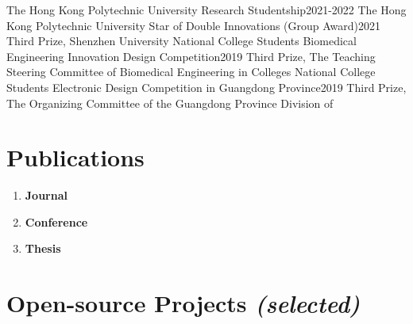 \documentclass[letterpaper,11pt]{article}
\begin{document}
    \resumeSubHeadingListStart
        \resumeSubheading
            {The Hong Kong Polytechnic University Research Studentship}{2021-2022}
            {The Hong Kong Polytechnic University}{}
        \resumeSubheading
            {Star of Double Innovations (Group Award)}{2021}
            {Third Prize, Shenzhen University}{}
        \resumeSubheading
            {National College Students Biomedical Engineering Innovation Design Competition}{2019}
            {Third Prize, The Teaching Steering Committee of Biomedical Engineering in Colleges}{}
        \resumeSubheading
            {National College Students Electronic Design Competition in Guangdong Province}{2019}
            {Third Prize, The Organizing Committee of the Guangdong Province Division of }{}
    \resumeSubHeadingListEnd

    \section{Publications}
    
    \begin{refsection}
        \nocite{*}

        \begin{enumerate}[leftmargin=0.15in, label={}, itemsep=0em]
            \item \textbf{Journal}
            \printbibliography[type=article, heading=none]
            \item \textbf{Conference}
            \printbibliography[type=inproceedings, heading=none]
            \item \textbf{Thesis}
            \printbibliography[type=thesis, heading=none]
            \printbibliography[type=phdthesis, heading=none]
        \end{enumerate}
    \end{refsection}

    \section{Open-source Projects \emph{(selected)}}
\end{document}
